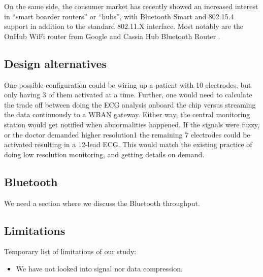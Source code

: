On the same side, the consumer market has recently showed an increased interest in ``smart boarder routers'' or ``hubs'', with Bluetooth Smart and 802.15.4 support in addition to the standard 802.11.X interface. Most notably are the OnHub WiFi router from Google \cite{newRef:60} and Cassia Hub Bluetooth Router \cite{newRef:61}.


\subsection{Design alternatives} %
\label{sub:design_alternatives}

One possible configuration could be wiring up a patient with 10 electrodes, but only having 3 of them activated at a time. Further, one would need to calculate the trade off between doing the ECG analysis onboard the chip versus streaming the data continuously to a WBAN gateway. Either way, the central monitoring station would get notified when abnormalities happened. If the signals were fuzzy, or the doctor demanded higher resolution{1} the remaining 7 electrodes could be activated resulting in a 12-lead ECG. This would match the existing practice of doing low resolution monitoring, and getting details on demand.


\subsection{Bluetooth} %
\label{sub:bluetooth}

We need a section where we discuss the Bluetooth throughput.


\subsection{Limitations} %
\label{sub:limitations}

Temporary list of limitations of our study:

\begin{itemize}

  \item We have not looked into signal nor data compression.

\end{itemize}


